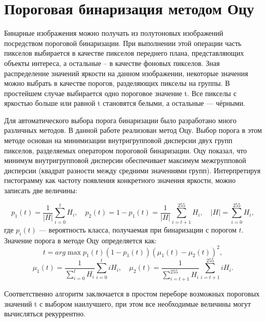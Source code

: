 \documentclass[12pt,a4paper]{extarticle} %
\begin{document}

\newpage

\section{Пороговая бинаризация методом Оцу}

    Бинарные изображения можно получать из полутоновых изображений посредством пороговой бинаризации. При выполнении этой операции часть пикселов выбирается в качестве пикселов переднего плана, представляющих объекты интереса, а остальные – в качестве фоновых пикселов. Зная распределение значений яркости на данном изображении, некоторые значения можно выбрать в качестве порогов, разделяющих пикселы на группы. В простейшем случае выбирается одно пороговое значение t. Все пикселы с яркостью больше или равной t становятся белыми, а остальные --- чёрными.\

    Для автоматического выбора порога бинаризации было разработано много различных методов. В данной работе реализован метод Оцу. Выбор порога в этом методе основан на минимизации внутригрупповой дисперсии двух групп пикселов, разделяемых оператором пороговой бинаризации. Оцу показал, что минимум внутригрупповой дисперсии обеспечивает максимум межгрупповой дисперсии (квадрат разности между средними значениями групп).
Интерпретируя гистограмму как частоту появления конкретного значения яркости, можно записать две величины:

\begin{equation*}
    p_1(t) = \frac{1}{| H |} \sum\limits_{i=0}^{t} H_i, \quad p_2(t)=1 - p_1(t) =  \frac{1}{| H |} \sum\limits_{i=t+1}^{255} H_i, \quad |H| = \sum\limits_{i=0}^{255} H_i,
\end{equation*}
где $p_i(t)$ --- вероятность класса, получаемая при бинаризации с порогом $t$. Значение порога в методе Оцу определяется как:
\begin{equation*}
    t= arg\max p_1(t)(1 - p_1(t))(\mu_1(t) - \mu_2(t))^2,
\end{equation*}
\begin{equation*}
     \mu_1(t) = \frac{1}{\sum\limits_{i=0}^t H_i} \sum\limits_{i=0}^t i H_i, \quad \mu_2(t) = \frac{1}{\sum\limits_{i=t+1}^{255} H_i} \sum\limits_{i=t+1}^{255} i H_i.
\end{equation*}

    Соответственно алгоритм заключается в простом переборе возможных пороговых значений t с выбором наилучшего, при этом все необходимые величины могут вычисляться рекуррентно.
\end{document}
